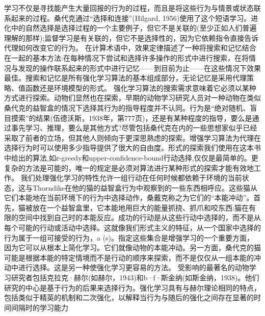 学习不仅是寻找能产生大量回报的行为的过程，而且是将这些行为与情景或状态联系起来的过程。桑代克通过“选择和连接”(Hilgard, 1956)使用了这个短语学习。进化中的自然选择是选择过程的一个主要例子，但它不是关联的(至少正如人们普遍理解的那样);监督学习是有关联的，但它不是选择性的，因为它依赖指令直接告诉代理如何改变它的行为。
在计算术语中，效果定律描述了一种将搜索和记忆结合在一起的基本方法:在每种情况下尝试和选择许多操作的形式中进行搜索，在将情况与发现的操作联系起来的形式中进行记忆——到目前为止——在这些情况下效果最佳。搜索和记忆是所有强化学习算法的基本组成部分，无论记忆是采用代理策略、值函数还是环境模型的形式。
强化学习算法的搜索需求意味着它必须以某种方式进行探索。动物们显然也在探索，早期的动物学习研究人员对一种动物在类似桑代克的益智盒的情况下选择其行为的指导程度并不认同。行为是“绝对随机、盲目摸索”的结果(伍德沃斯，1938年，第777页)，还是有某种程度的指导，要么是通过事先学习、推理，要么是其他方式?尽管包括桑代克在内的一些思想家似乎已经采取了前者的立场，但其他人则倾向于更深思熟虑的探索。增强学习算法为代理在选择行为时可以使用多少指导提供了很大的自由度。形式的探索我们使用在这本书中给出的算法,如ε-greedy和upper-confidence-bound行动选择,仅仅是最简单的。更复杂的方法是可能的，唯一的规定是必须对算法进行某种形式的探索才能有效地工作。
我们处理强化学习的特性允许一组行动在任何时候都依赖于环境的当前状态，这与Thorndike在他的猫的益智盒行为中观察到的一些东西相呼应。这些猫从它们本能地在当前环境下的行为中选择动作，桑戴克称之为它们的“本能冲动”。首先，猫被放在一个益智盒里，它本能地用巨大的能量抓挠、抓爪和咬东西:猫在有限的空间中找到自己时的本能反应。成功的行动是从这些行动中选择的，而不是从每个可能的行动或活动中选择。这就像我们形式主义的特征，从一个国家中选择的行为属于一组可接受的行为，a (s)。指定这些集合是增强学习的一个重要方面，因为它可以从根本上简化学习。它们就像动物的本能冲动。另一方面，桑代克的猫可能是根据本能的特定情境而不是行动的顺序来探索，而不是仅仅从一组本能的冲动中进行选择。这是另一种使强化学习更容易的方法。
受影响的最著名的动物学习研究者包括克拉克·赫尔(如赫尔，1943)和b·f·斯金纳(如斯金纳，1938)。他们研究的中心是基于行为的后果来选择行为。强化学习具有与赫尔理论相同的特点，包括类似于精英的机制和二次强化，以解释当行为与随后的强化之间存在显著的时间间隔时的学习能力

